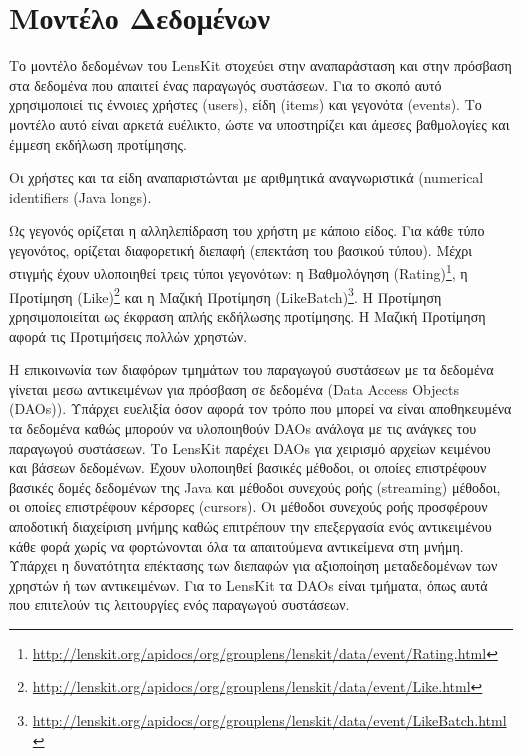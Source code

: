 \section{Μοντέλο Δεδομένων}
Το μοντέλο δεδομένων του {\en LensKit} στοχεύει στην αναπαράσταση και στην πρόσβαση στα δεδομένα που απαιτεί ένας παραγωγός συστάσεων. Για το σκοπό αυτό χρησιμοποιεί τις έννοιες χρήστες ({\en users}), είδη ({\en items}) και γεγονότα ({\en events}). Το μοντέλο αυτό είναι αρκετά ευέλικτο, ώστε να υποστηρίζει και άμεσες βαθμολογίες και έμμεση εκδήλωση προτίμησης. \par
Οι χρήστες και τα είδη αναπαριστώνται με αριθμητικά αναγνωριστικά ({\en numerical identifiers (Java longs)}. \par
Ως γεγονός ορίζεται η αλληλεπίδραση του χρήστη με κάποιο είδος. Για κάθε τύπο γεγονότος, ορίζεται διαφορετική διεπαφή (επεκτάση του βασικού τύπου). Μέχρι στιγμής έχουν υλοποιηθεί τρεις τύποι γεγονότων: η Βαθμολόγηση ({\en Rating})\footnote{\en \url{http://lenskit.org/apidocs/org/grouplens/lenskit/data/event/Rating.html}}, η Προτίμηση ({\en Like})\footnote{\en \url{http://lenskit.org/apidocs/org/grouplens/lenskit/data/event/Like.html}} και η Μαζική Προτίμηση ({\en LikeBatch})\footnote{\en \url{http://lenskit.org/apidocs/org/grouplens/lenskit/data/event/LikeBatch.html}}. Η Προτίμηση χρησιμοποιείται ως έκφραση απλής εκδήλωσης προτίμησης. Η Μαζική Προτίμηση αφορά τις Προτιμήσεις πολλών χρηστών. \par
Η επικοινωνία των διαφόρων τμημάτων του παραγωγού συστάσεων με τα δεδομένα γίνεται μεσω αντικειμένων για πρόσβαση σε δεδομένα ({\en Data Access Objects (DAOs))}. Υπάρχει ευελιξία όσον αφορά τον τρόπο που μπορεί να είναι αποθηκευμένα τα δεδομένα καθώς μπορούν να υλοποιηθούν {\en DAOs} ανάλογα με τις ανάγκες του παραγωγού συστάσεων. Το {\en LensKit} παρέχει {\en DAOs} για χειρισμό αρχείων κειμένου και βάσεων δεδομένων. Έχουν υλοποιηθεί βασικές μέθοδοι, οι οποίες επιστρέφουν βασικές δομές δεδομένων της {\en Java} και μέθοδοι συνεχούς ροής ({\en streaming}) μέθοδοι, οι οποίες επιστρέφουν κέρσορες ({\en cursors}). Οι μέθοδοι συνεχούς ροής προσφέρουν αποδοτική διαχείριση μνήμης καθώς επιτρέπουν την επεξεργασία ενός αντικειμένου κάθε φορά χωρίς να φορτώνονται όλα τα απαιτούμενα αντικείμενα στη μνήμη. Υπάρχει η δυνατότητα επέκτασης των διεπαφών για αξιοποίηση μεταδεδομένων των χρηστών ή των αντικειμένων. Για το {\en LensKit} τα \en DAOs \el είναι τμήματα, όπως αυτά που επιτελούν τις λειτουργίες ενός παραγωγού συστάσεων.
